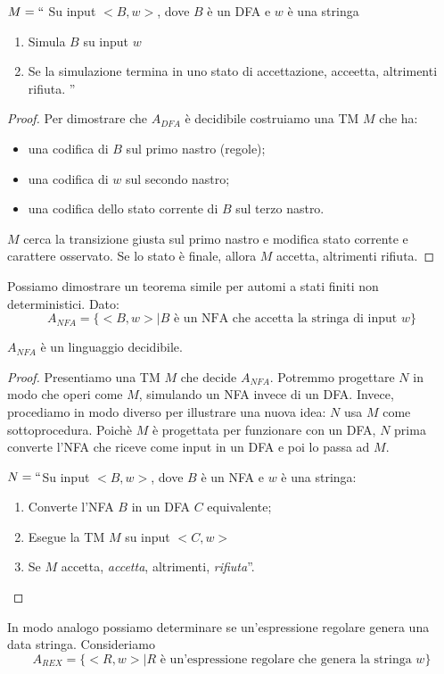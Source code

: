\documentclass[12pt]{report}
\newcounter{theorem}
\begin{document}
$M = ``$ Su input $<B, w>$, dove $B$ è un DFA e  $w$ è una stringa
\begin{enumerate}
	\item Simula $B$ su input $w$
	\item Se la simulazione termina in uno stato di accettazione, acceetta, altrimenti rifiuta. ''
\end{enumerate}
\begin{proof}
	Per dimostrare che $A_{DFA}$ è decidibile costruiamo una TM $M$ che ha:
	\begin{itemize}
		\item una codifica di $B$ sul primo nastro (regole);
		\item una codifica di $w$ sul secondo nastro;
		\item una codifica dello stato corrente di $B$ sul terzo nastro.
	\end{itemize}
	$M$ cerca la transizione giusta sul primo nastro e modifica stato corrente e carattere osservato. Se lo stato è finale, allora $M$ accetta, altrimenti rifiuta.
\end{proof}
Possiamo dimostrare un teorema simile per automi a stati finiti non deterministici. Dato:
\[
A_{NFA} = \{<B, w> \mid B \text{ è un NFA che accetta la stringa di input } w\}
\]
\begin{theorem}{}{}
	$A_{NFA}$ è un linguaggio decidibile.
\end{theorem}
\begin{proof}
	Presentiamo una TM $M$ che decide $A_{NFA}$. Potremmo progettare $N$ in modo che operi come $M$, simulando un NFA invece di un DFA. Invece, procediamo in modo diverso per illustrare una nuova idea: $N$ usa $M$ come sottoprocedura. Poichè $M$ è progettata per funzionare con un DFA, $N$ prima converte l'NFA che riceve come input in un DFA e poi lo passa ad $M$.

	$N = ``$Su input $<B, w>$, dove $B$ è un NFA e $w$ è una stringa:
	\begin{enumerate}
		\item Converte l'NFA $B$ in un DFA $C$ equivalente;
		\item Esegue la TM $M$ su input $<C, w>$
		\item Se $M$ accetta, \textit{accetta}, altrimenti, \textit{rifiuta}''.
	\end{enumerate}
\end{proof}
In modo analogo possiamo determinare se un'espressione regolare genera una data stringa. Consideriamo
\[
A_{REX} = \{<R, w> \mid R \text{ è un'espressione regolare che genera la stringa } w\}
\]
\end{document}
